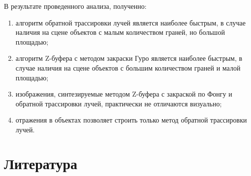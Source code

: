 \documentclass[12pt]{report}
\begin{document}
	В результате проведенного анализа, полученно:
	\begin{enumerate}
		\item алгоритм обратной трассировки лучей является наиболее быстрым, в случае наличия на сцене объектов с малым количеством граней, но большой площадью;
		\item алгоритм Z-буфера с методом закраски Гуро является наиболее быстрым, в случае наличия на сцене объектов с большим количеством граней и малой площадью;
		\item изображения, синтезируемые методом Z-буфера с закраской по Фонгу и обратной трассировки лучей, практически не отличаются визуально;
		\item отражения в объектах позволяет строить только метод обратной трассировки лучей.
	\end{enumerate}

	\chapter*{Литература}
	
\end{document}
